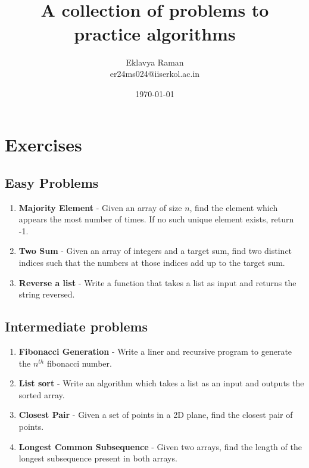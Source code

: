 \documentclass[openany]{book}
\begin{document}
\title{\Large{} \\ \vspace{5pt}
\large{A collection of problems to practice algorithms}}
\author{Eklavya Raman \\ \vspace{5pt} er24ms024@iiserkol.ac.in \\ \vspace{5pt}}
\date{\today}
\maketitle

\section{Exercises}
\subsection{Easy Problems}
\begin{enumerate}
\item \textbf{Majority Element} - Given an array of size $n$, find the element which appears the most number of times. If no such unique element exists, return -1.
\item \textbf{Two Sum} - Given an array of integers and a target sum, find two distinct indices such that the numbers at those indices add up to the target sum.
\item \textbf{Reverse a list} - Write a function that takes a list as input and returns the string reversed.
\end{enumerate}
\subsection{Intermediate problems}
\begin{enumerate}
    \item \textbf{Fibonacci Generation} - Write a liner and recursive program to generate the $n^{th}$ fibonacci number. 
    \item \textbf{List sort} - Write an algorithm which takes a list as an input and outputs the sorted array. 
    \item \textbf{Closest Pair} - Given a set of points in a 2D plane, find the closest pair of points.
    \item \textbf{Longest Common Subsequence} - Given two arrays, find the length of the longest subsequence present in both arrays.
\end{enumerate}
\end{document}
